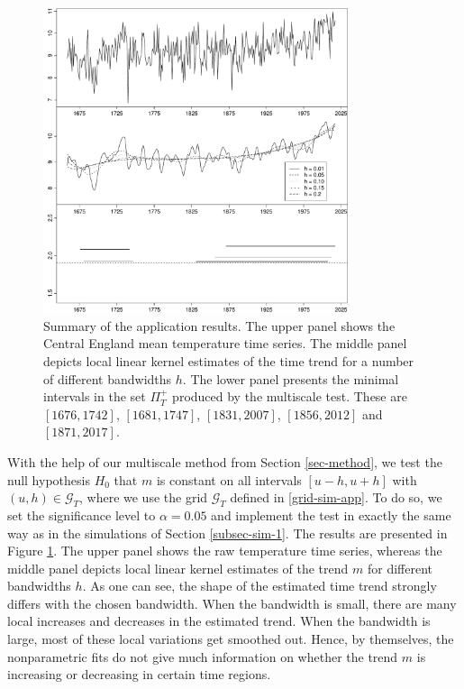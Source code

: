 \begin{figure}[t]
\centering
\includegraphics[width=0.8\textwidth]{Plots/temperature_data.pdf}
\caption{Summary of the application results. The upper panel shows the Central England mean temperature time series. The middle panel depicts local linear kernel estimates of the time trend for a number of different bandwidths $h$. The lower panel presents the minimal intervals in the set $\Pi_T^+$ produced by the multiscale test. These are $[1676,1742]$, $[1681,1747]$, $[1831,2007]$, $[1856, 2012]$ and $[1871,2017]$.}\label{plot-results-app1}
\end{figure}


With the help of our multiscale method from Section \ref{sec-method}, we test the null hypothesis $H_0$ that $m$ is constant on all intervals $[u-h,u+h]$ with $(u,h) \in \mathcal{G}_T$, where we use the grid $\mathcal{G}_T$ defined in \eqref{grid-sim-app}. To do so, we set the significance level to $\alpha = 0.05$ and implement the test in exactly the same way as in the simulations of Section \ref{subsec-sim-1}. The results are presented in Figure \ref{plot-results-app1}. The upper panel shows the raw temperature time series, whereas the middle panel depicts local linear kernel estimates of the trend $m$ for different bandwidths $h$. As one can see, the shape of the estimated time trend strongly differs with the chosen bandwidth. When the bandwidth is small, there are many local increases and decreases in the estimated trend. When the bandwidth is large, most of these local variations get smoothed out. Hence, by themselves, the nonparametric fits do not give much information on whether the trend $m$ is increasing or decreasing in certain time regions. 


